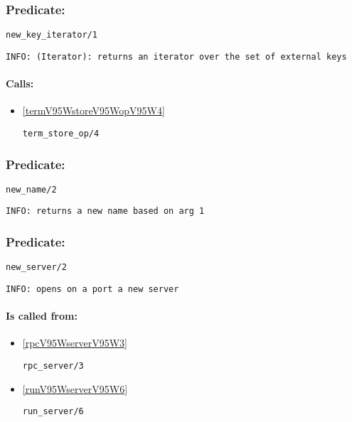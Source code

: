 \subsubsection{Predicate:} \label{newV95WkeyV95WiteratorV95W1}

\begin{verbatim}
new_key_iterator/1
\end{verbatim}

{\small \begin{verbatim}
INFO: (Iterator): returns an iterator over the set of external keys

\end{verbatim}}
\paragraph{Calls:} 
\begin{itemize}
\item \ref{termV95WstoreV95WopV95W4} 
\begin{verbatim}
term_store_op/4
\end{verbatim}

\end{itemize}

\subsubsection{Predicate:} \label{newV95WnameV95W2}

\begin{verbatim}
new_name/2
\end{verbatim}

{\small \begin{verbatim}
INFO: returns a new name based on arg 1

\end{verbatim}}

\subsubsection{Predicate:} \label{newV95WserverV95W2}

\begin{verbatim}
new_server/2
\end{verbatim}

{\small \begin{verbatim}
INFO: opens on a port a new server

\end{verbatim}}
\paragraph{Is called from:} 
\begin{itemize}
\item \ref{rpcV95WserverV95W3} 
\begin{verbatim}
rpc_server/3
\end{verbatim}

\item \ref{runV95WserverV95W6} 
\begin{verbatim}
run_server/6
\end{verbatim}

\end{itemize}

